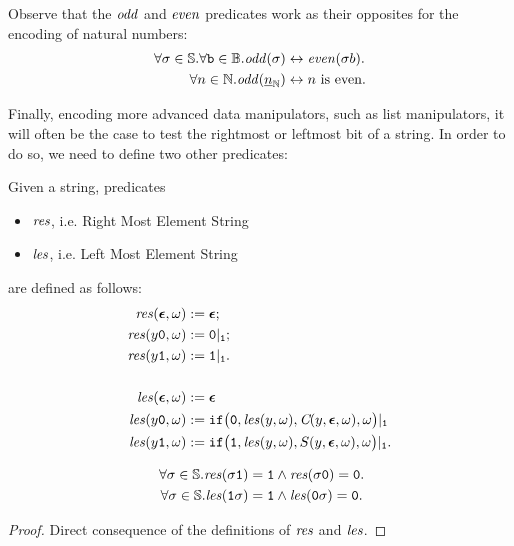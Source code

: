 \begin{remark}
Observe that the $\mathit{odd}$ and $\mathit{even}$
predicates work as their opposites
for the encoding of natural numbers:
\begin{align*}
\forall \sigma \in {\Ss}.\forall \bool
\in \Bool. \odd(\sigma) &\leftrightarrow
\even(\sigma b). \\
%
\forall n\in \Nat.\odd{(\ovverline{n}{\Nat})} &\leftrightarrow
n \text{ is even.}
\end{align*}
\end{remark}

Finally, encoding more advanced data manipulators,
such as list manipulators, it will often be the case to
test the rightmost or leftmost bit of a string.
In order to do so, we need to define two other predicates:

\begin{defn}
Given a string, predicates
\begin{itemize}
  \item $\mathit{res}$, i.e. Right Most Element String
  \item $\mathit{les}$, i.e. Left Most Element String
\end{itemize}
are defined as follows:
\begin{align*}
\mathit{res}(\bm{\epsilon},\omega) &:= \bm{\epsilon}; \\
\mathit{res}(y\mathtt{0}, \omega) &:= \mathtt{0}|_{\mathtt{1}}; \\
\mathit{res}(y\mathtt{1},\omega) &:= \mathtt{1}|_{\mathtt{1}}. \\
\\
\mathit{les}(\bm{\epsilon},\omega) &:= \bm{\epsilon} \\
\mathit{les}(y\mathtt{0},\omega) &:= \mathtt{if}\big(\mathtt{0}, \mathit{les}(y,\omega),
{\emph{C}}(y,\bm{\epsilon},\omega),\omega\big)|_{\mathtt{1}} \\
\mathit{les}(y\mathtt{1},\omega) &:= \mathtt{if}\big(\mathtt{1},
\mathit{les}(y,\omega), S(y,\bm{\epsilon},\omega),\omega\big)|_{\mathtt{1}}.
\end{align*}
\end{defn}

\begin{remark}
\begin{align*}\
\forall \sigma \in {\Ss}.\res(\sigma \one) &=
\one \wedge \res(\sigma\zero)=\zero. \\
%
\forall \sigma \in {\Ss}.\les(\one\sigma) &=
\one \wedge \les(\zero\sigma)=\zero.
\end{align*}
\end{remark}
\begin{proof}
  Direct consequence of the definitions of $\mathit{res}$ and $\mathit{les}$.
\end{proof}

